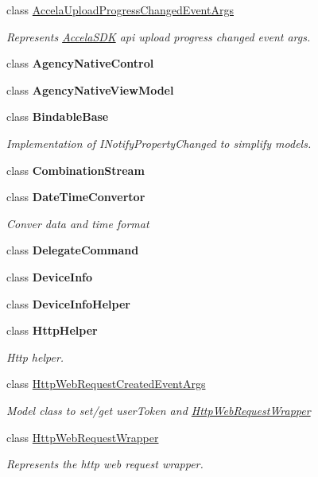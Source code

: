 \begin{DoxyCompactItemize}
class \hyperlink{class_accela_1_1_windows_store_s_d_k_1_1_accela_upload_progress_changed_event_args}{Accela\+Upload\+Progress\+Changed\+Event\+Args}
\begin{DoxyCompactList}\small\item\em Represents \hyperlink{class_accela_1_1_windows_store_s_d_k_1_1_accela_s_d_k}{Accela\+S\+D\+K} api upload progress changed event args. \end{DoxyCompactList}\item 
class {\bfseries Agency\+Native\+Control}
\item 
class {\bfseries Agency\+Native\+View\+Model}
\item 
class {\bfseries Bindable\+Base}
\begin{DoxyCompactList}\small\item\em Implementation of I\+Notify\+Property\+Changed to simplify models. \end{DoxyCompactList}\item 
class {\bfseries Combination\+Stream}
\item 
class {\bfseries Date\+Time\+Convertor}
\begin{DoxyCompactList}\small\item\em Conver data and time format \end{DoxyCompactList}\item 
class {\bfseries Delegate\+Command}
\item 
class {\bfseries Device\+Info}
\item 
class {\bfseries Device\+Info\+Helper}
\item 
class {\bfseries Http\+Helper}
\begin{DoxyCompactList}\small\item\em Http helper. \end{DoxyCompactList}\item 
class \hyperlink{class_accela_1_1_windows_store_s_d_k_1_1_http_web_request_created_event_args}{Http\+Web\+Request\+Created\+Event\+Args}
\begin{DoxyCompactList}\small\item\em Model class to set/get user\+Token and \hyperlink{class_accela_1_1_windows_store_s_d_k_1_1_http_web_request_wrapper}{Http\+Web\+Request\+Wrapper} \end{DoxyCompactList}\item 
class \hyperlink{class_accela_1_1_windows_store_s_d_k_1_1_http_web_request_wrapper}{Http\+Web\+Request\+Wrapper}
\begin{DoxyCompactList}\small\item\em Represents the http web request wrapper. \end{DoxyCompactList}\item 

\end{DoxyCompactItemize}
